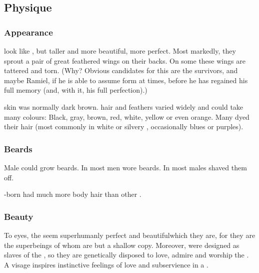 








\subsection{Physique}





\subsubsection{Appearance}
\Resphain{} look like \humans, but taller and more beautiful, more perfect. 
Most markedly, they sprout a pair of great feathered wings on their backs. 
On some \resphain{} these wings are tattered and torn. 
(Why? 
Obvious candidates for this are the \Kezeradi{} survivors, and maybe Ramiel, if he is able to assume \resphan{} form at times, before he has regained his full memory (and, with it, his full perfection).)

\Resphan skin was normally dark brown. 
\Resphan hair and feathers varied widely and could take many colours: Black, gray, brown, red, white, yellow or even orange.
Many dyed their hair (most commonly in white or silvery \colours, occasionally blues or purples). 





\subsubsection{Beards}
Male \resphain could grow beards. 
In \Mystraacht most men wore beards. 
In \CiriathSepher most males shaved them off. 

\Nephil-born  had much more body hair than other \resphain.





\subsubsection{Beauty}
To \human{} eyes, the \resphain{} seem superhumanly perfect and beautiful\dash which they are, for they are the superbeings of whom \humans{} are but a shallow copy. 
Moreover, \humans{} were designed as slaves of the \resphain, so they are genetically disposed to love, admire and worship the \resphain. 
A \resphan{} visage inspires instinctive feelings of love and subservience in a \human. 

